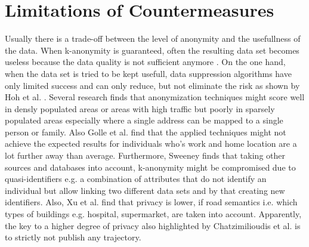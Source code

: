 \section{Limitations of Countermeasures}
Usually there is a trade-off between the level of anonymity and the usefullness of the data. When k-anonymity is guaranteed, often the resulting data set becomes useless because the data quality is not sufficient anymore \parencite{krumm, cellphone, k-anonymity-old, k-anonymity, k-anonymity-achieving}.
On the one hand, when the data set is tried to be kept usefull, data suppression algorithms have only limited success and can only reduce, but not eliminate the risk as shown by Hoh et al. \parencite{hoh2006enhancing}. Several research \parencite{time-to-confusion, location-privacy, hoh2006enhancing} finds that anonymization techniques might score well in densly populated areas or areas with high traffic but poorly in sparsely populated areas especially where a single address can be mapped to a single person or family. Also Golle et al. \parencite{privacy-home-work-pairs} find that the applied techniques might not achieve the expected results for individuals who's work and home location are a lot further away than average.
Furthermore, Sweeney \parencite{k-anonymity-achieving} finds that taking other sources and databases into account, k-anonymity might be compromised due to quasi-identifiers e.g. a combination of attributes that do not identify an individual but allow linking two different data sets and by that creating new identifiers. Also, Xu et al. \parencite{xu2018location} find that privacy is lower, if road semantics i.e. which types of buildings e.g. hospital, supermarket, are taken into account.
Apparently, the key to a higher degree of privacy also highlighted by Chatzimilioudis et al. \parencite{chatzimilioudis2012crowdsourcing} is to strictly not publish any trajectory.


